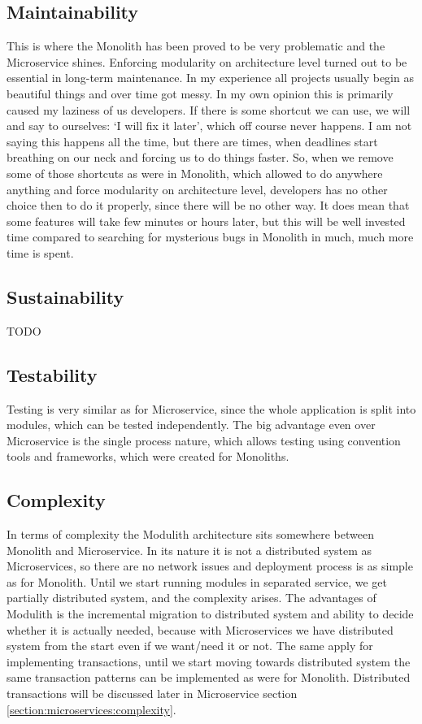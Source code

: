 \subsection{Maintainability}
This is where the Monolith has been proved to be very problematic and the Microservice shines. Enforcing modularity on architecture level turned out to be essential in long-term maintenance. In my experience all projects usually begin as beautiful things and over time got messy. In my own opinion this is primarily caused my laziness of us developers. If there is some shortcut we can use, we will and say to ourselves: `I will fix it later', which off course never happens. I am not saying this happens all the time, but there are times, when deadlines start breathing on our neck and forcing us to do things faster. So, when we remove some of those shortcuts as were in Monolith, which allowed to do anywhere anything and force modularity on architecture level, developers has no other choice then to do it properly, since there will be no other way. It does mean that some features will take few minutes or hours later, but this will be well invested time compared to searching for mysterious bugs in Monolith in much, much more time is spent.

\subsection{Sustainability}
TODO

\subsection{Testability}
Testing is very similar as for Microservice, since the whole application is split into modules, which can be tested independently. The big advantage even over Microservice is the single process nature, which allows testing using convention tools and frameworks, which were created for Monoliths.

\subsection{Complexity}
In terms of complexity the Modulith architecture sits somewhere between Monolith and Microservice. In its nature it is not a distributed system as Microservices, so there are no network issues and deployment process is as simple as for Monolith. Until we start running modules in separated service, we get partially distributed system, and the complexity arises. The advantages of Modulith is the incremental migration to distributed system and ability to decide whether it is actually needed, because with Microservices we have distributed system from the start even if we want/need it or not. The same apply for implementing transactions, until we start moving towards distributed system the same transaction patterns can be implemented as were for Monolith. Distributed transactions will be discussed later in Microservice section \ref{section:microservices:complexity}.